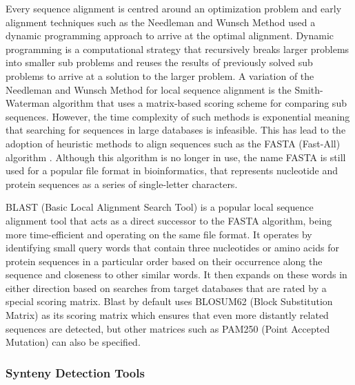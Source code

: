 Every sequence alignment is centred around an optimization problem and early alignment techniques such as the Needleman and Wunsch Method \cite{needleman1970general} used a dynamic programming approach to arrive at the optimal alignment. Dynamic programming is a computational strategy that recursively breaks larger problems into smaller sub problems and reuses the results of previously solved sub problems to arrive at a solution to the larger problem. A variation of the Needleman and Wunsch Method for local sequence alignment is the Smith-Waterman algorithm\cite{smith1981identification} that uses a matrix-based scoring scheme for comparing sub sequences.
However, the time complexity of such methods is exponential meaning that searching for sequences in large databases is infeasible. This has lead to the adoption of heuristic methods to align sequences such as the FASTA (Fast-All) algorithm \cite{lipman1985rapid}. Although this algorithm is no longer in use, the name FASTA is still used for a popular file format in bioinformatics, that represents nucleotide and protein sequences as a series of single-letter characters.

BLAST (Basic Local Alignment Search Tool) is a popular local sequence alignment tool that acts as a direct successor to the FASTA algorithm, being more time-efficient and operating on the same file format\cite{pertsemlidis2001having}. It operates by identifying small query words that contain three nucleotides or amino acids for protein sequences in a particular order based on their occurrence along the sequence and closeness to other similar words. It then expands on these words in  either direction based on searches from target databases that are rated by a special scoring matrix. Blast by default uses BLOSUM62 (Block Substitution Matrix) as its scoring matrix which ensures that even more distantly related sequences are detected, but other matrices such as PAM250 (Point Accepted Mutation) can also be specified.



\subsubsection{Synteny Detection Tools}

